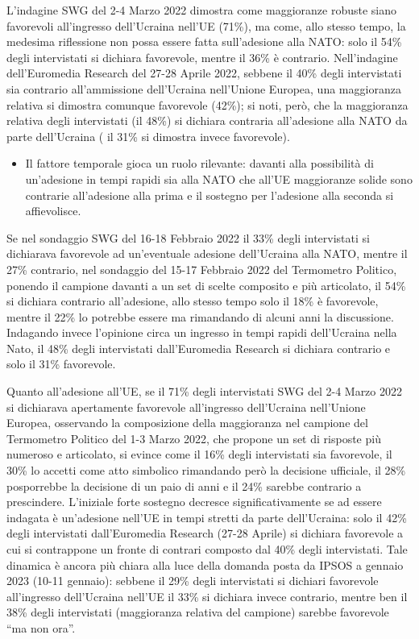 \documentclass[
]{book}
\providecommand{\tightlist}{%
  \setlength{\itemsep}{0pt}\setlength{\parskip}{0pt}}
\begin{document}
L'indagine SWG del 2-4 Marzo 2022 dimostra come maggioranze robuste siano favorevoli all'ingresso dell'Ucraina nell'UE (71\%), ma come, allo stesso tempo, la medesima riflessione non possa essere fatta sull'adesione alla NATO: solo il 54\% degli intervistati si dichiara favorevole, mentre il 36\% è contrario. Nell'indagine dell'Euromedia Research del 27-28 Aprile 2022, sebbene il 40\% degli intervistati sia contrario all'ammissione dell'Ucraina nell'Unione Europea, una maggioranza relativa si dimostra comunque favorevole (42\%); si noti, però, che la maggioranza relativa degli intervistati (il 48\%) si dichiara contraria all'adesione alla NATO da parte dell'Ucraina ( il 31\% si dimostra invece favorevole).

\begin{itemize}
\tightlist
\item
  Il fattore temporale gioca un ruolo rilevante: davanti alla possibilità di un'adesione in tempi rapidi sia alla NATO che all'UE maggioranze solide sono contrarie all'adesione alla prima e il sostegno per l'adesione alla seconda si affievolisce.
\end{itemize}

Se nel sondaggio SWG del 16-18 Febbraio 2022 il 33\% degli intervistati si dichiarava favorevole ad un'eventuale adesione dell'Ucraina alla NATO, mentre il 27\% contrario, nel sondaggio del 15-17 Febbraio 2022 del Termometro Politico, ponendo il campione davanti a un set di scelte composito e più articolato, il 54\% si dichiara contrario all'adesione, allo stesso tempo solo il 18\% è favorevole, mentre il 22\% lo potrebbe essere ma rimandando di alcuni anni la discussione. Indagando invece l'opinione circa un ingresso in tempi rapidi dell'Ucraina nella Nato, il 48\% degli intervistati dall'Euromedia Research si dichiara contrario e solo il 31\% favorevole.

Quanto all'adesione all'UE, se il 71\% degli intervistati SWG del 2-4 Marzo 2022 si dichiarava apertamente favorevole all'ingresso dell'Ucraina nell'Unione Europea, osservando la composizione della maggioranza nel campione del Termometro Politico del 1-3 Marzo 2022, che propone un set di risposte più numeroso e articolato, si evince come il 16\% degli intervistati sia favorevole, il 30\% lo accetti come atto simbolico rimandando però la decisione ufficiale, il 28\% posporrebbe la decisione di un paio di anni e il 24\% sarebbe contrario a prescindere. L'iniziale forte sostegno decresce significativamente se ad essere indagata è un'adesione nell'UE in tempi stretti da parte dell'Ucraina: solo il 42\% degli intervistati dall'Euromedia Research (27-28 Aprile) si dichiara favorevole a cui si contrappone un fronte di contrari composto dal 40\% degli intervistati. Tale dinamica è ancora più chiara alla luce della domanda posta da IPSOS a gennaio 2023 (10-11 gennaio): sebbene il 29\% degli intervistati si dichiari favorevole all'ingresso dell'Ucraina nell'UE il 33\% si dichiara invece contrario, mentre ben il 38\% degli intervistati (maggioranza relativa del campione) sarebbe favorevole ``ma non ora''.
\end{document}
